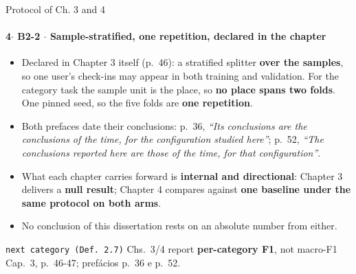 \documentclass{beamer}
\begin{document}
\begin{frame}[noframenumbering]{Protocol of Ch. 3 and 4}
    \framesubtitle{\normalsize 4$\cdot$ \textbf{B2-2} $\cdot$ Sample-stratified, one repetition, declared in the chapter}
    \hypertarget{b22}{}
    \small
    \begin{itemize}\setlength{\itemsep}{0pt}\setlength{\parskip}{0pt}
        \item Declared in Chapter 3 itself (p.~46): a stratified splitter \textbf{over the samples}, so one user's check-ins may appear in both training and validation. For the category task the sample unit is the place, so \textbf{no place spans two folds}. One pinned seed, so the five folds are \textbf{one repetition}.
        \item Both prefaces date their conclusions: p.~36, \textit{``Its conclusions are the conclusions of the time, for the configuration studied here''}; p.~52, \textit{``The conclusions reported here are those of the time, for that configuration''}.
        \item What each chapter carries forward is \textbf{internal and directional}: Chapter 3 delivers a \textbf{null result}; Chapter 4 compares against \textbf{one baseline under the same protocol on both arms}.
        \item No conclusion of this dissertation rests on an absolute number from either.
    \end{itemize}
    \vfill
    {\scriptsize\texttt{next category (Def.~2.7)} \textbullet{} Chs.~3/4 report \textbf{per-category F1}, not macro-F1 \textbullet{} \textcolor{black!70}{Cap.~3, p.~46-47; prefácios p.~36 e p.~52.}\hfill\hyperlink{b0}{}}
\end{frame}
\end{document}
